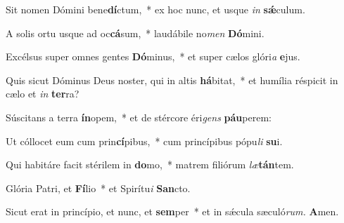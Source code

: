 \item Sit nomen Dómini bene\textbf{dí}ctum,~* ex hoc nunc, et usque \textit{in} \textbf{sǽ}culum.
\item A solis ortu usque ad oc\textbf{cá}sum,~* laudábile no\textit{men} \textbf{Dó}mini.
\item Excélsus super omnes gentes \textbf{Dó}minus,~* et super cælos glóri\tinyhspace\textit{a} \textbf{e}jus.
\item Quis sicut Dóminus Deus noster, qui in altis \textbf{há}bitat,~* et humília réspicit in cælo et \textit{in} \textbf{ter}ra?
\item Súscitans a terra \textbf{ín}opem,~* et de stércore éri\textit{gens} \textbf{páu}perem:
\item Ut cóllocet eum cum prin\textbf{cí}pibus,~* cum princípibus pópu\tinyhspace\textit{li} \textbf{su}i.
\item Qui habitáre facit stérilem in \textbf{do}mo,~* matrem filiórum \textit{læ}\textbf{tán}tem.
\item Glória Patri, et \textbf{Fí}lio~* et Spirítu\textit{i} \textbf{San}cto.
\item Sicut erat in princípio, et nunc, et \textbf{sem}per~* et in sǽcula sæculó\textit{rum.} \textbf{A}men.